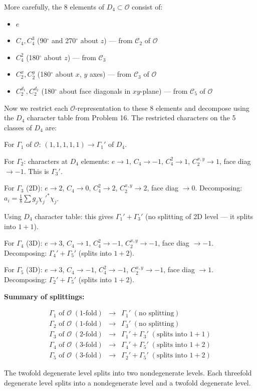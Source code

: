 \documentclass[12pt]{article}
\begin{document}
More carefully, the 8 elements of $D_4 \subset \mathscr{O}$ consist of:
\begin{itemize}
\item $e$
\item $C_4, C_4^3$ (90$^\circ$ and 270$^\circ$ about $z$) --- from $\mathcal{C}_2$ of $\mathscr{O}$
\item $C_4^2$ (180$^\circ$ about $z$) --- from $\mathcal{C}_3$
\item $C_2^x, C_2^y$ (180$^\circ$ about $x$, $y$ axes) --- from $\mathcal{C}_3$ of $\mathscr{O}$
\item $C_2^{d_1}, C_2^{d_2}$ (180$^\circ$ about face diagonals in $xy$-plane) --- from $\mathcal{C}_5$ of $\mathscr{O}$
\end{itemize}

Now we restrict each $\mathscr{O}$-representation to these 8 elements and decompose using the $D_4$ character table from Problem 16. The restricted characters on the 5 classes of $D_4$ are:

For $\Gamma_1$ of $\mathscr{O}$: $(1, 1, 1, 1, 1) \to \Gamma_1'$ of $D_4$.

For $\Gamma_2$: characters at $D_4$ elements: $e \to 1$, $C_4 \to -1$, $C_4^2 \to 1$, $C_2^{x,y} \to 1$, face diag $\to -1$. This is $\Gamma_3'$.

For $\Gamma_3$ (2D): $e \to 2$, $C_4 \to 0$, $C_4^2 \to 2$, $C_2^{x,y} \to 2$, face diag $\to 0$. Decomposing: $a_i = \frac{1}{8}\sum g_j \chi_j'^* \chi_j$.

Using $D_4$ character table: this gives $\Gamma_1' + \Gamma_3'$ (no splitting of 2D level --- it splits into $1+1$).

For $\Gamma_4$ (3D): $e \to 3$, $C_4 \to 1$, $C_4^2 \to -1$, $C_2^{x,y} \to -1$, face diag $\to -1$. Decomposing: $\Gamma_4' + \Gamma_5'$ (splits into $1 + 2$).

For $\Gamma_5$ (3D): $e \to 3$, $C_4 \to -1$, $C_4^2 \to -1$, $C_2^{x,y} \to -1$, face diag $\to 1$. Decomposing: $\Gamma_2' + \Gamma_5'$ (splits into $1 + 2$).

\medskip
\noindent\textbf{Summary of splittings:}

\[
\begin{array}{lcl}
\Gamma_1 \text{ of } \mathscr{O} \;(\text{1-fold}) &\to& \Gamma_1' \;(\text{no splitting}) \\
\Gamma_2 \text{ of } \mathscr{O} \;(\text{1-fold}) &\to& \Gamma_3' \;(\text{no splitting}) \\
\Gamma_3 \text{ of } \mathscr{O} \;(\text{2-fold}) &\to& \Gamma_1' + \Gamma_3' \;(\text{splits into } 1 + 1) \\
\Gamma_4 \text{ of } \mathscr{O} \;(\text{3-fold}) &\to& \Gamma_4' + \Gamma_5' \;(\text{splits into } 1 + 2) \\
\Gamma_5 \text{ of } \mathscr{O} \;(\text{3-fold}) &\to& \Gamma_2' + \Gamma_5' \;(\text{splits into } 1 + 2)
\end{array}
\]

The twofold degenerate level splits into two nondegenerate levels. Each threefold degenerate level splits into a nondegenerate level and a twofold degenerate level.
\end{document}
